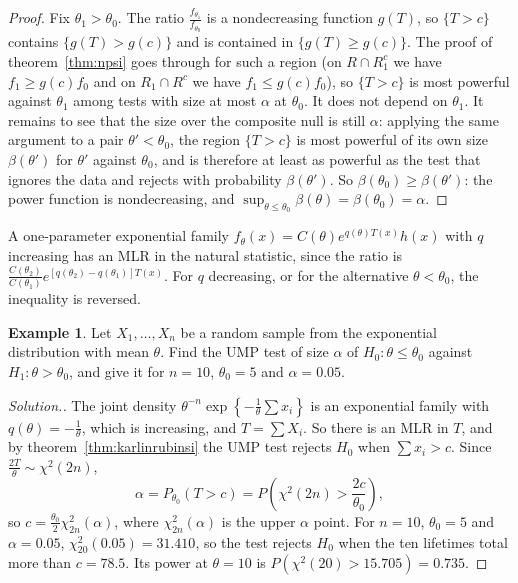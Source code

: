 \documentclass[12pt,a4paper]{report}
\theoremstyle{definition}
\newtheorem{exa}[thm]{Example}
\newenvironment{solution}
  {\renewcommand{\qedsymbol}{}\begin{proof}[\textit{Solution}.]}
  {\end{proof}}
\begin{document}
\begin{proof}
Fix $\theta_1>\theta_0$. The ratio $\frac{f_{\theta_1}}{f_{\theta_0}}$ is a nondecreasing function
$g(T)$, so $\{T>c\}$ contains $\{g(T)>g(c)\}$ and is contained in $\{g(T)\ge g(c)\}$.
The proof of theorem~\ref{thm:npsi} goes through for such a region (on
$R\cap R_1^c$ we have $f_1\ge g(c)f_0$ and on $R_1\cap R^c$ we have $f_1\le g(c)f_0$), so
$\{T>c\}$ is most powerful against $\theta_1$ among tests with size at most $\alpha$ at
$\theta_0$. It does not depend on $\theta_1$. It remains to see that the size over the
composite null is still $\alpha$: applying the same argument to a pair
$\theta'<\theta_0$, the region $\{T>c\}$ is most powerful of its own size $\beta(\theta')$ for
$\theta'$ against $\theta_0$, and is therefore at least as powerful as the test that
ignores the data and rejects with probability $\beta(\theta')$. So
$\beta(\theta_0)\ge\beta(\theta')$: the power function is nondecreasing, and
$\sup_{\theta\le\theta_0}\beta(\theta) = \beta(\theta_0) = \alpha$.
\end{proof}

A one-parameter exponential family $f_\theta(x) = C(\theta)e^{q(\theta)T(x)}h(x)$ with $q$
increasing has an MLR in the natural statistic, since the ratio is
$\frac{C(\theta_2)}{C(\theta_1)}e^{[q(\theta_2) - q(\theta_1)]T(x)}$. For $q$ decreasing, or for the
alternative $\theta<\theta_0$, the inequality is reversed.

\begin{exa}
\label{ex:umpexponentialsi}
Let $X_1, \dots, X_n$ be a random sample from the exponential distribution with mean
$\theta$. Find the UMP test of size $\alpha$ of $H_0\colon\theta\le\theta_0$ against
$H_1\colon\theta>\theta_0$, and give it for $n = 10$, $\theta_0 = 5$ and $\alpha = 0.05$.
\end{exa}

\begin{solution}
The joint density $\theta^{-n}\exp\left\{-\frac1\theta\sum x_i\right\}$ is an exponential family
with $q(\theta) = -\frac1\theta$, which is increasing, and $T = \sum X_i$. So there is an MLR
in $T$, and by theorem~\ref{thm:karlinrubinsi} the UMP test rejects $H_0$ when
$\sum x_i>c$. Since $\frac{2T}{\theta}\sim\chi^2(2n)$,
\[\alpha = P_{\theta_0}(T>c) = P\left(\chi^2(2n)>\frac{2c}{\theta_0}\right),\]
so $c = \frac{\theta_0}{2}\chi^2_{2n}(\alpha)$, where $\chi^2_{2n}(\alpha)$ is the upper $\alpha$ point.
For $n = 10$, $\theta_0 = 5$ and $\alpha = 0.05$, $\chi^2_{20}(0.05) = 31.410$, so the test
rejects $H_0$ when the ten lifetimes total more than $c = 78.5$. Its power at
$\theta = 10$ is $P\left(\chi^2(20)>15.705\right) = 0.735$.
\end{solution}
\end{document}
